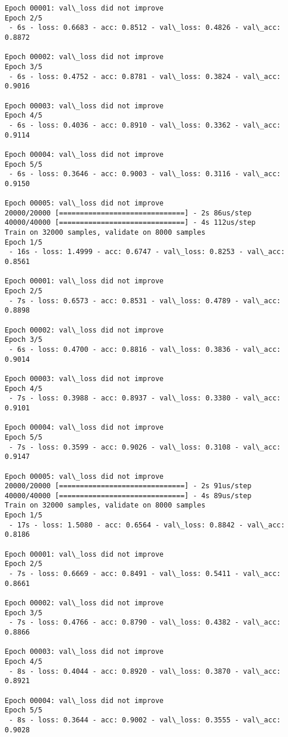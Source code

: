 \documentclass[11pt]{article}
\begin{document}
\begin{Verbatim}[commandchars=\\\{\}]
Epoch 00001: val\_loss did not improve
Epoch 2/5
 - 6s - loss: 0.6683 - acc: 0.8512 - val\_loss: 0.4826 - val\_acc: 0.8872

Epoch 00002: val\_loss did not improve
Epoch 3/5
 - 6s - loss: 0.4752 - acc: 0.8781 - val\_loss: 0.3824 - val\_acc: 0.9016

Epoch 00003: val\_loss did not improve
Epoch 4/5
 - 6s - loss: 0.4036 - acc: 0.8910 - val\_loss: 0.3362 - val\_acc: 0.9114

Epoch 00004: val\_loss did not improve
Epoch 5/5
 - 6s - loss: 0.3646 - acc: 0.9003 - val\_loss: 0.3116 - val\_acc: 0.9150

Epoch 00005: val\_loss did not improve
20000/20000 [==============================] - 2s 86us/step
40000/40000 [==============================] - 4s 112us/step
Train on 32000 samples, validate on 8000 samples
Epoch 1/5
 - 16s - loss: 1.4999 - acc: 0.6747 - val\_loss: 0.8253 - val\_acc: 0.8561

Epoch 00001: val\_loss did not improve
Epoch 2/5
 - 7s - loss: 0.6573 - acc: 0.8531 - val\_loss: 0.4789 - val\_acc: 0.8898

Epoch 00002: val\_loss did not improve
Epoch 3/5
 - 6s - loss: 0.4700 - acc: 0.8816 - val\_loss: 0.3836 - val\_acc: 0.9014

Epoch 00003: val\_loss did not improve
Epoch 4/5
 - 7s - loss: 0.3988 - acc: 0.8937 - val\_loss: 0.3380 - val\_acc: 0.9101

Epoch 00004: val\_loss did not improve
Epoch 5/5
 - 7s - loss: 0.3599 - acc: 0.9026 - val\_loss: 0.3108 - val\_acc: 0.9147

Epoch 00005: val\_loss did not improve
20000/20000 [==============================] - 2s 91us/step
40000/40000 [==============================] - 4s 89us/step
Train on 32000 samples, validate on 8000 samples
Epoch 1/5
 - 17s - loss: 1.5080 - acc: 0.6564 - val\_loss: 0.8842 - val\_acc: 0.8186

Epoch 00001: val\_loss did not improve
Epoch 2/5
 - 7s - loss: 0.6669 - acc: 0.8491 - val\_loss: 0.5411 - val\_acc: 0.8661

Epoch 00002: val\_loss did not improve
Epoch 3/5
 - 7s - loss: 0.4766 - acc: 0.8790 - val\_loss: 0.4382 - val\_acc: 0.8866

Epoch 00003: val\_loss did not improve
Epoch 4/5
 - 8s - loss: 0.4044 - acc: 0.8920 - val\_loss: 0.3870 - val\_acc: 0.8921

Epoch 00004: val\_loss did not improve
Epoch 5/5
 - 8s - loss: 0.3644 - acc: 0.9002 - val\_loss: 0.3555 - val\_acc: 0.9028


\end{Verbatim}
\end{document}
